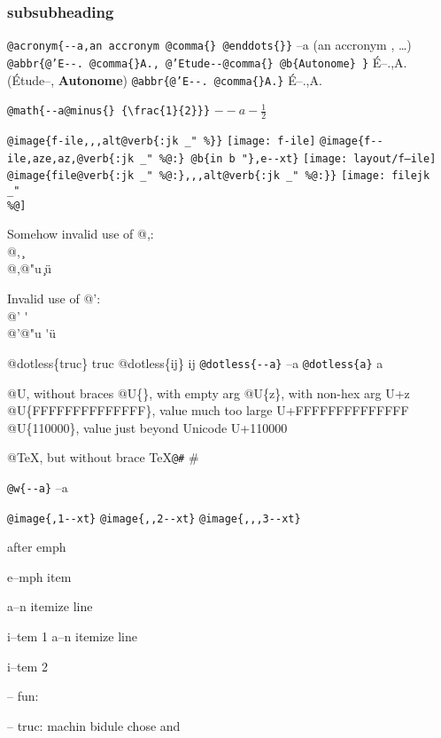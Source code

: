 \documentclass{book}
\newcommand{\GNUTexinfoplaceholder}[1]{}
\newcommand{\GNUTexinfonopagebreakheading}[2]{\let\clearpage\relax \let\cleardoublepage\relax \let\thispagestyle\GNUTexinfoplaceholder #1{#2}}
\renewcommand{\includegraphics}[1]{\fbox{FIG #1}}
\begin{document}
\GNUTexinfonopagebreakheading{\subsubsection*}{subsubheading}


\texttt{@acronym\{{-}{-}a,an accronym @comma\{\} @enddots\{\}\}} --a (an accronym , \dots{})
\texttt{@abbr\{@'E{-}{-}. @comma\{\}A., @'Etude{-}{-}@comma\{\} @b\{Autonome\} \}} \'{E}--.\@ ,A.\@ (\'{E}tude--, \textbf{Autonome})
\texttt{@abbr\{@'E{-}{-}. @comma\{\}A.\}} \'{E}--.\@ ,A.\@

\texttt{@math\{{-}{-}a@minus\{\} \{\textbackslash{}frac\{1\}\{2\}\}\}} $--a- {\frac{1}{2}}$

\texttt{@image\{f-ile,,,alt@verb\{:jk \_" \%\@\}\}} \texttt{[image: f-ile]}
\texttt{@image\{f{-}{-}ile,aze,az,@verb\{:jk \_" \%@:\} @b\{in b "\},e{-}{-}xt\}} \texttt{[image: layout/f--ile]}
\texttt{@image\{file@verb\{:jk \_" \%@:\},,,alt@verb\{:jk \_" \%@:\}\}} \texttt{[image: filejk \\\_" \\\%@]}




Somehow invalid use of @,:\leavevmode{}\\
@, \c{}
\leavevmode{}\\
@,@"u \c{}\"{u}

Invalid use of @':\leavevmode{}\\
@' \'{}
\leavevmode{}\\
@'@"u \'{}\"{u}

@dotless\{truc\} truc
@dotless\{ij\} ij
\texttt{@dotless\{{-}{-}a\}} --a
\texttt{@dotless\{a\}} a

@U, without braces @U\{\}, with empty arg 
@U\{z\}, with non-hex arg U+z
@U\{FFFFFFFFFFFFFF\}, value much too large U+FFFFFFFFFFFFFF
@U\{110000\}, value just beyond Unicode U+110000

@TeX, but without brace \TeX{}\texttt{@\#} \#

\texttt{@w\{{-}{-}a\}} \hbox{--a}

\texttt{@image\{,1{-}{-}xt\}} 
\texttt{@image\{,,2{-}{-}xt\}} 
\texttt{@image\{,,,3{-}{-}xt\}} 


\emph{} after emph 

e--mph item

\textbullet{} a--n itemize line 

i--tem 1
\textbullet{} a--n itemize line 

i--tem 2

\hbox{}-- fun: 


\hbox{}-- truc: machin bidule chose and
\end{document}

